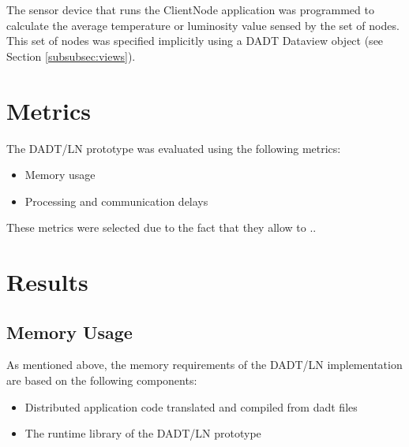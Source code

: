 The sensor device that runs the ClientNode application was programmed to 
calculate the average temperature or luminosity value sensed by the set of
nodes. This set of nodes was specified implicitly using a DADT Dataview object
(see Section \ref{subsubsec:views}).


\section{Metrics}

The DADT/LN prototype was evaluated using the following metrics:
\begin{itemize}
\item Memory usage
\item Processing and communication delays
\end{itemize} 

These metrics were selected due to the fact that they allow to  ..  


\section{Results}

\subsection{Memory Usage}

As mentioned above, the memory requirements of the DADT/LN implementation are
based on the following components:
\begin{itemize}
  \item Distributed application code translated and compiled from dadt files
  \item The runtime library of the DADT/LN prototype
\end{itemize}



